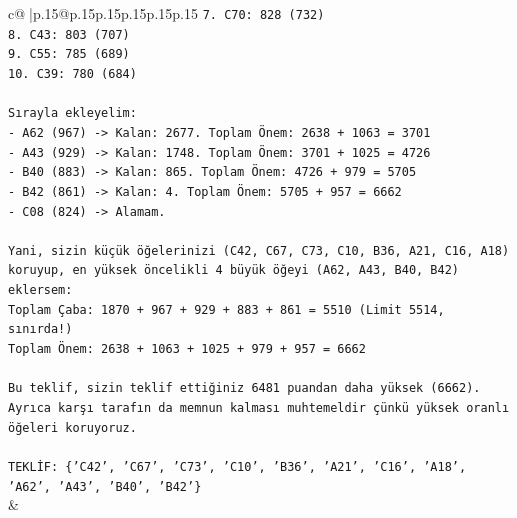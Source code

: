 \documentclass{article}
\begin{document}
{\begin{supertabular}{c@{$\;$}|p{.15\linewidth}@{}p{.15\linewidth}p{.15\linewidth}p{.15\linewidth}p{.15\linewidth}p{.15\linewidth}}
{{{\texttt{7. C70: 828 (732)} \\
\texttt{8. C43: 803 (707)} \\
\texttt{9. C55: 785 (689)} \\
\texttt{10. C39: 780 (684)} \\
\\ 
\texttt{Sırayla ekleyelim:} \\
\texttt{{-} A62 (967) {-}> Kalan: 2677. Toplam Önem: 2638 + 1063 = 3701} \\
\texttt{{-} A43 (929) {-}> Kalan: 1748. Toplam Önem: 3701 + 1025 = 4726} \\
\texttt{{-} B40 (883) {-}> Kalan: 865. Toplam Önem: 4726 + 979 = 5705} \\
\texttt{{-} B42 (861) {-}> Kalan: 4. Toplam Önem: 5705 + 957 = 6662} \\
\texttt{{-} C08 (824) {-}> Alamam.} \\
\\ 
\texttt{Yani, sizin küçük öğelerinizi (C42, C67, C73, C10, B36, A21, C16, A18) koruyup, en yüksek öncelikli 4 büyük öğeyi (A62, A43, B40, B42) eklersem:} \\
\texttt{Toplam Çaba: 1870 + 967 + 929 + 883 + 861 = 5510 (Limit 5514, sınırda!)} \\
\texttt{Toplam Önem: 2638 + 1063 + 1025 + 979 + 957 = 6662} \\
\\ 
\texttt{Bu teklif, sizin teklif ettiğiniz 6481 puandan daha yüksek (6662).} \\
\texttt{Ayrıca karşı tarafın da memnun kalması muhtemeldir çünkü yüksek oranlı öğeleri koruyoruz.} \\
\\ 
\texttt{TEKLİF: \{'C42', 'C67', 'C73', 'C10', 'B36', 'A21', 'C16', 'A18', 'A62', 'A43', 'B40', 'B42'\}} \\
            }
        }
    }
    & \\ \\


\end{supertabular}}
\end{document}
